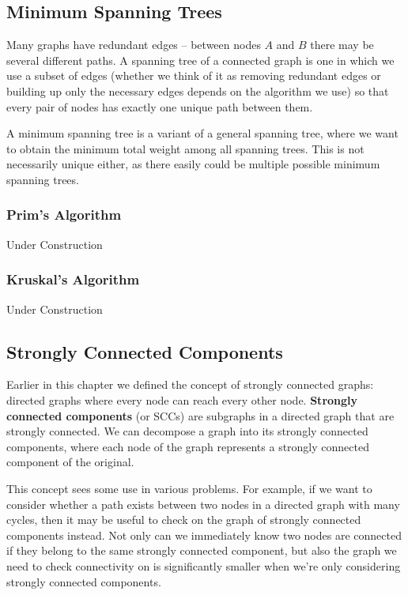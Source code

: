 \subsection{Minimum Spanning Trees}
 

Many graphs have redundant edges -- between nodes $A$ and $B$ there may be several different paths. A spanning tree of a connected graph is one in which we use a subset of edges (whether we think of it as removing redundant edges or building up only the necessary edges depends on the algorithm we use) so that every pair of nodes has exactly one unique path between them.

A minimum spanning tree is a variant of a general spanning tree, where we want to obtain the minimum total weight among all spanning trees. This is not necessarily unique either, as there easily could be multiple possible minimum spanning trees.

\subsubsection{Prim's Algorithm}

Under Construction

\subsubsection{Kruskal's Algorithm}

Under Construction

\subsection{Strongly Connected Components}

Earlier in this chapter we defined the concept of strongly connected graphs: directed graphs where every node can reach every other node. \textbf{Strongly connected components} (or SCCs) are subgraphs in a directed graph that are strongly connected. We can decompose a graph into its strongly connected components, where each node of the graph represents a strongly connected component of the original.

This concept sees some use in various problems. For example, if we want to consider whether a path exists between two nodes in a directed graph with many cycles, then it may be useful to check on the graph of strongly connected components instead. Not only can we immediately know two nodes are connected if they belong to the same strongly connected component, but also the graph we need to check connectivity on is significantly smaller when we're only considering strongly connected components.

